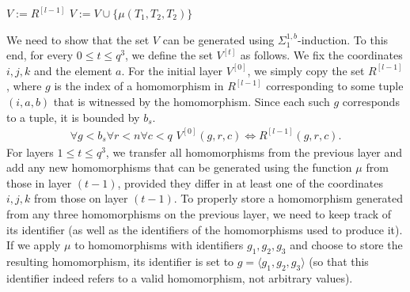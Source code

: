 \documentclass{article}
\newcommand{\bl}{\color{black}}
\theoremstyle{definition}
\theoremstyle{theorem}
\theoremstyle{theorem}
\theoremstyle{remark}
\theoremstyle{remark}
\theoremstyle{example}
\theoremstyle{notation}
\theoremstyle{theorem}
\begin{document}
\begin{algorithm}[H]
\caption{: $nonempty^1(R^{[l-1]},  i,j,k, E^{[ij]}_{\ddot{\mathcal{A}}}\times\{a\})$}\label{alg:cap}
\begin{algorithmic}[1] 
\State $V:=R^{[l-1]}$
   \State $V:=V\cup \{\mu(T_1,T_2,T_2)\}$
\EndWhile{}\Comment{\color{gray}bounded by $q^3$\bl}
\Else{} 
    \Return{$\emptyset$}
\EndIf{}
\end{algorithmic}
\end{algorithm}
We need to show that the set $V$ can be generated using $\Sigma^{1,b}_1$-induction. To this end, for every $0 \leq t \leq q^3$, we define the set $V^{[t]}$ as follows. We fix the coordinates $i, j, k$ and the element $a$. For the initial layer $V^{[0]}$, we simply copy the set $R^{[l-1]}$, where $g$ is the index of a homomorphism in $R^{[l-1]}$ corresponding to some tuple $(i, a, b)$ that is witnessed by the homomorphism. Since each such $g$ corresponds to a tuple, it is bounded by $b_s$.
\begin{equation}
    \begin{gathered}
\forall g<b_s \forall r<n\forall c<q \,\, V^{[0]}( g,r,c)\iff R^{[l-1]}(g,r,c).       
    \end{gathered}
\end{equation}
For layers $1 \leq t \leq q^3$, we transfer all homomorphisms from the previous layer and add any new homomorphisms that can be generated using the function $\mu$ from those in layer $(t-1)$, provided they differ in at least one of the coordinates $i, j, k$ from those on layer $(t-1)$. To properly store a homomorphism generated from any three homomorphisms on the previous layer, we need to keep track of its identifier (as well as the identifiers of the homomorphisms used to produce it). If we apply $\mu$ to homomorphisms with identifiers $g_1, g_2, g_3$ and choose to store the resulting homomorphism, its identifier is set to $g = \langle g_1, g_2, g_3 \rangle$ (so that this identifier indeed refers to a valid homomorphism, not arbitrary values).
\end{document}
